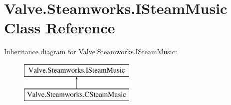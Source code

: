 \hypertarget{classValve_1_1Steamworks_1_1ISteamMusic}{}\section{Valve.\+Steamworks.\+I\+Steam\+Music Class Reference}
\label{classValve_1_1Steamworks_1_1ISteamMusic}
Inheritance diagram for Valve.\+Steamworks.\+I\+Steam\+Music\+:\begin{figure}[H]
\begin{center}
\leavevmode
\includegraphics[height=2.000000cm]{classValve_1_1Steamworks_1_1ISteamMusic}
\end{center}
\end{figure}
